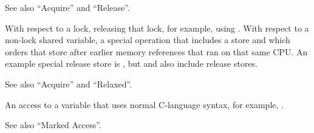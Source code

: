 \begin{description}[style=nextline]
	See also ``Acquire'' and ``Release''.

  \item[Release:]
	With respect to a lock, releasing that lock, for example,
	using .
	With respect to a non-lock shared variable, a special operation
	that includes a store and which orders that store after earlier
	memory references that ran on that same CPU\@.
	An example special release store is , but
	 and  also
	include release stores.

	See also ``Acquire'' and ``Relaxed''.

  \item[Unmarked Access:]
	An access to a variable that uses normal C-language
	syntax, for example, .

	See also ``Marked Access''.
\end{description}
